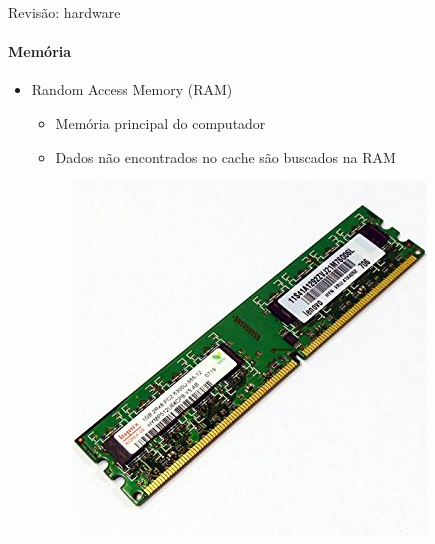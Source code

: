 \documentclass{beamer}
\begin{document}
\begin{frame}{Revisão: hardware}
	\framesubtitle{Memória}
	\begin{itemize}
		\item Random Access Memory (RAM)
		\begin{itemize}
			\item Memória principal do computador
			\item Dados não encontrados no cache são buscados na RAM
		\end{itemize}
		\begin{figure}
			\includegraphics[width=0.4\paperwidth]{resources/memory}
		\end{figure}
	\end{itemize}
\end{frame}
\end{document}
